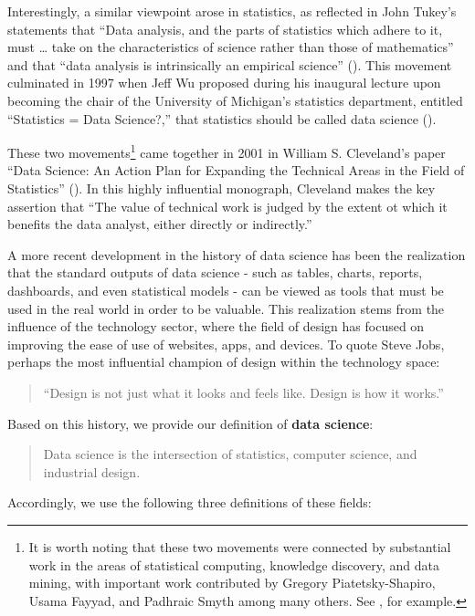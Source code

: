 \documentclass[
]{book}
\begin{document}
Interestingly, a similar viewpoint arose in statistics, as reflected in John Tukey's statements that ``Data analysis, and the parts of statistics which adhere to it, must \ldots{} take on the characteristics of science rather than those of mathematics'' and that ``data analysis is intrinsically an empirical science'' (\citet{Tukey1962}). This movement culminated in 1997 when Jeff Wu proposed during his inaugural lecture upon becoming the chair of the University of Michigan's statistics department, entitled ``Statistics = Data Science?,'' that statistics should be called data science (\citet{Wu1997}).

These two movements\footnote{It is worth noting that these two movements were connected by substantial work in the areas of statistical computing, knowledge discovery, and data mining, with important work contributed by Gregory Piatetsky-Shapiro, Usama Fayyad, and Padhraic Smyth among many others. See \citet{Fayyad1996}, for example.} came together in 2001 in William S. Cleveland's paper ``Data Science: An Action Plan for Expanding the Technical Areas in the Field of Statistics'' (\citet{Cleveland2001}). In this highly influential monograph, Cleveland makes the key assertion that ``The value of technical work is judged by the extent ot which it benefits the data analyst, either directly or indirectly.''

A more recent development in the history of data science has been the realization that the standard outputs of data science - such as tables, charts, reports, dashboards, and even statistical models - can be viewed as tools that must be used in the real world in order to be valuable. This realization stems from the influence of the technology sector, where the field of design has focused on improving the ease of use of websites, apps, and devices. To quote Steve Jobs, perhaps the most influential champion of design within the technology space:

\begin{quote}
``Design is not just what it looks and feels like. Design is how it works.''
\end{quote}

Based on this history, we provide our definition of \textbf{data science}:

\begin{quote}
Data science is the intersection of statistics, computer science, and industrial design.
\end{quote}

Accordingly, we use the following three definitions of these fields:
\end{document}
